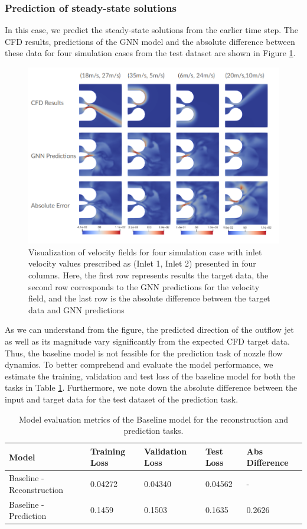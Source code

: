 \subsubsection{Prediction of steady-state solutions}
In this case, we predict the steady-state solutions from the earlier time step. The CFD results, predictions of the GNN model and the absolute difference between these data for four simulation cases from the test dataset are shown in Figure \ref{blpred}.
\begin{figure}[ht]
    \centering
    \includegraphics[width=14cm]{images/Methodology/Baselineprediction.png}
    \caption{Visualization of velocity fields for four simulation case with inlet velocity values prescribed as (Inlet 1, Inlet 2) presented in four columns. Here, the first row represents results the target data, the second row corresponds to the GNN predictions for the velocity field, and the last row is the absolute difference between the target data and GNN predictions} 
    \label{blpred}
\end{figure}
As we can understand from the figure, the predicted direction of the outflow jet as well as its magnitude vary significantly from the expected CFD target data. Thus, the baseline model is not feasible for the prediction task of nozzle flow dynamics. To better comprehend and evaluate the model performance, we estimate the training, validation and test loss of the baseline model for both the tasks in Table \ref{table:perform}. Furthermore, we note down the absolute difference between the input and target data for the test dataset of the prediction task. 
\begin{table}[ht]
    \centering
    \caption{Model evaluation metrics of the Baseline model for the reconstruction and prediction tasks.} 
    \label{table:perform}
    \begin{tabular}{|l|l|l|l|l|}
    \hline
    \textbf{Model} & \textbf{Training Loss} & \textbf{Validation Loss} & \textbf{Test Loss} & \textbf{Abs Difference} \\
    \hline
    Baseline - Reconstruction & 0.04272 & 0.04340 & 0.04562 & - \\
    \hline
    Baseline - Prediction & 0.1459 & 0.1503 & 0.1635 & 0.2626\\
    \hline
    \end{tabular}
    \end{table}
    
